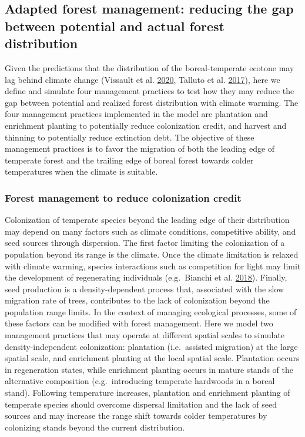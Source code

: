 \documentclass[12pt]{article}
\begin{document}
\hypertarget{adapted-forest-management-reducing-the-gap-between-potential-and-actual-forest-distribution}{%
\subsection{Adapted forest management: reducing the gap between
potential and actual forest
distribution}\label{adapted-forest-management-reducing-the-gap-between-potential-and-actual-forest-distribution}}

Given the predictions that the distribution of the boreal-temperate
ecotone may lag behind climate change (Vissault et al.
\protect\hyperlink{ref-Vissault2020}{2020}, Talluto et al.
\protect\hyperlink{ref-Talluto2017}{2017}), here we define and simulate
four management practices to test how they may reduce the gap between
potential and realized forest distribution with climate warming. The
four management practices implemented in the model are plantation and
enrichment planting to potentially reduce colonization credit, and
harvest and thinning to potentially reduce extinction debt. The
objective of these management practices is to favor the migration of
both the leading edge of temperate forest and the trailing edge of
boreal forest towards colder temperatures when the climate is suitable.

\hypertarget{forest-management-to-reduce-colonization-credit}{%
\subsubsection{Forest management to reduce colonization
credit}\label{forest-management-to-reduce-colonization-credit}}

Colonization of temperate species beyond the leading edge of their
distribution may depend on many factors such as climate conditions,
competitive ability, and seed sources through dispersion. The first
factor limiting the colonization of a population beyond its range is the
climate. Once the climate limitation is relaxed with climate warming,
species interactions such as competition for light may limit the
development of regenerating individuals (e.g.~Bianchi et al.
\protect\hyperlink{ref-Bianchi2018}{2018}). Finally, seed production is
a density-dependent process that, associated with the slow migration
rate of trees, contributes to the lack of colonization beyond the
population range limits. In the context of managing ecological
processes, some of these factors can be modified with forest management.
Here we model two management practices that may operate at different
spatial scales to simulate density-independent colonization: plantation
(i.e.~assisted migration) at the large spatial scale, and enrichment
planting at the local spatial scale. Plantation occurs in regeneration
states, while enrichment planting occurs in mature stands of the
alternative composition (e.g.~introducing temperate hardwoods in a
boreal stand). Following temperature increases, plantation and
enrichment planting of temperate species should overcome dispersal
limitation and the lack of seed sources and may increase the range shift
towards colder temperatures by colonizing stands beyond the current
distribution.
\end{document}

